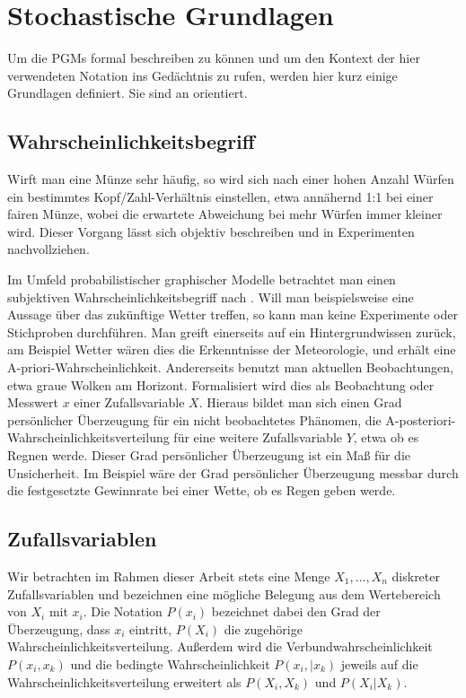 \documentclass{llncs}
\begin{document}
\section{Stochastische Grundlagen}

Um die PGMs formal beschreiben zu können und um den Kontext der hier verwendeten Notation ins Gedächtnis zu rufen, werden hier kurz einige Grundlagen definiert. Sie sind an \cite{koller2009probabilistic} orientiert. 

\subsection{Wahrscheinlichkeitsbegriff}

Wirft man eine Münze sehr häufig, so wird sich nach einer hohen Anzahl Würfen ein bestimmtes Kopf/Zahl-Verhältnis einstellen, etwa annähernd 1:1 bei einer fairen Münze, wobei die erwartete Abweichung bei mehr Würfen immer kleiner wird. Dieser Vorgang lässt sich objektiv beschreiben und in Experimenten nachvollziehen. 

Im Umfeld probabilistischer graphischer Modelle betrachtet man einen subjektiven Wahrscheinlichkeitsbegriff nach \cite{simon1958elements}. Will man beispielsweise eine Aussage über das zukünftige Wetter treffen, so kann man keine Experimente oder Stichproben durchführen. Man greift einerseits auf ein Hintergrundwissen zurück, am Beispiel Wetter wären dies die Erkenntnisse der Meteorologie, und erhält eine A-priori-Wahrscheinlichkeit. Andererseits benutzt man aktuellen Beobachtungen, etwa graue Wolken am Horizont. Formalisiert wird dies als Beobachtung oder Messwert $x$ einer Zufallsvariable $X$. Hieraus bildet man sich einen Grad persönlicher Überzeugung für ein nicht beobachtetes Phänomen, die A-posteriori-Wahrscheinlichkeitsverteilung für eine weitere Zufallsvariable $Y$, etwa ob es Regnen werde. Dieser Grad persönlicher Überzeugung ist ein Maß für die Unsicherheit. Im Beispiel wäre der Grad persönlicher Überzeugung messbar durch die festgesetzte Gewinnrate bei einer Wette, ob es Regen geben werde. 

\subsection{Zufallsvariablen}

Wir betrachten im Rahmen dieser Arbeit stets eine Menge $X_1,\dots,X_n$ diskreter Zufallsvariablen und bezeichnen eine mögliche Belegung aus dem Wertebereich von $X_i$ mit $x_i$. Die Notation $P(x_i)$ bezeichnet dabei den Grad der Überzeugung, dass $x_i$ eintritt, $P(X_i)$ die zugehörige Wahrscheinlichkeitsverteilung. Außerdem wird die Verbundwahrscheinlichkeit $P(x_i,x_k)$ und die bedingte Wahrscheinlichkeit $P(x_i,|x_k)$ jeweils auf die Wahrscheinlichkeitsverteilung erweitert als $P(X_i,X_k)$ und $P(X_i|X_k)$. 
\end{document}
